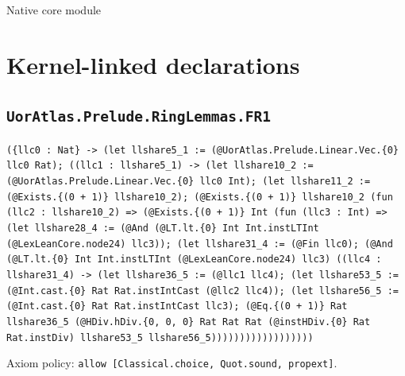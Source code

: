 \documentclass[11pt]{article}
\begin{document}
\begin{center}{\LARGE Native core module}\end{center}
\section*{Kernel-linked declarations}
\subsection*{\texttt{UorAtlas.Prelude.RingLemmas.FR1}}
\noindent\texttt{(\{llc0 : Nat\} -> (let llshare5\_1 := (@UorAtlas.Prelude.Linear.Vec.\{0\} llc0 Rat); ((llc1 : llshare5\_1) -> (let llshare10\_2 := (@UorAtlas.Prelude.Linear.Vec.\{0\} llc0 Int); (let llshare11\_2 := (@Exists.\{(0 + 1)\} llshare10\_2); (@Exists.\{(0 + 1)\} llshare10\_2 (fun (llc2 : llshare10\_2) => (@Exists.\{(0 + 1)\} Int (fun (llc3 : Int) => (let llshare28\_4 := (@And (@LT.lt.\{0\} Int Int.instLTInt (@LexLeanCore.node24) llc3)); (let llshare31\_4 := (@Fin llc0); (@And (@LT.lt.\{0\} Int Int.instLTInt (@LexLeanCore.node24) llc3) ((llc4 : llshare31\_4) -> (let llshare36\_5 := (@llc1 llc4); (let llshare53\_5 := (@Int.cast.\{0\} Rat Rat.instIntCast (@llc2 llc4)); (let llshare56\_5 := (@Int.cast.\{0\} Rat Rat.instIntCast llc3); (@Eq.\{(0 + 1)\} Rat llshare36\_5 (@HDiv.hDiv.\{0, 0, 0\} Rat Rat Rat (@instHDiv.\{0\} Rat Rat.instDiv) llshare53\_5 llshare56\_5))))))))))))))))))}\par
\noindent Axiom policy: \texttt{allow [Classical.choice, Quot.sound, propext]}.\par
\end{document}
